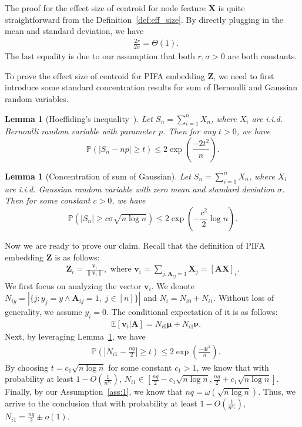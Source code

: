 \documentclass{article} %
\newtheorem{lemma}[theorem]{Lemma}
\begin{document}
The proof for the effect size of centroid for node feature $\mathbf{X}$ is quite straightforward from the Definition~\ref{def:eff_size}. By directly plugging in the mean and standard deviation, we have
\begin{align}
	& \frac{2r}{2\sigma} = \Theta(1).
\end{align}
The last equality is due to our assumption that both $r,\sigma>0$ are both constants.

To prove the effect size of centroid for PIFA embedding $\mathbf{Z}$, we need to first introduce some standard concentration results for sum of Bernoulli and Gaussian random variables.

\begin{lemma}	[Hoeffiding's inequality~\citep{hoeffding1994probability}]\label{lma:Hoeffding}
	Let $S_n=\sum_{i=1}^{n}X_n$, where $X_i$ are i.i.d. Bernoulli random variable with parameter $p$. Then for any $t>0$, we have
	\begin{equation}
		\mathbb{P}\left(|S_n - np|\geq t\right) \leq 2 \exp(\frac{-2t^2}{n}).
	\end{equation}
\end{lemma}

\begin{lemma}	[Concentration of sum of Gaussian]\label{lma:gauss_concentration}
	Let $S_n=\sum_{i=1}^{n}X_n$, where $X_i$ are i.i.d. Gaussian random variable with zero mean and standard deviation $\sigma$. Then for some constant $c>0$, we have
	\begin{equation}
		\mathbb{P}\left(|S_n|\geq c\sigma \sqrt{n\log n }\right) \leq 2 \exp(-\frac{c^2}{2}\log n).
	\end{equation}
\end{lemma}

Now we are ready to prove our claim. Recall that the definition of PIFA embedding $\mathbf{Z}$ is as follows:
\begin{align}
	\mathbf{Z}_i=\frac{\mathbf{v}_i}{\|\mathbf{v}_i\|},\text{ where }\mathbf{v}_i=\sum_{j:\mathbf{A}_{ij}=1}\mathbf{X}_j=\left[\mathbf{A}\mathbf{X}\right]_i.
\end{align}
We first focus on analyzing the vector $\mathbf{v}_i$. We denote $N_{iy}=|\{j:y_j=y \wedge \mathbf{A}_{ij}=1,\;j\in[n]\}|$ and $N_i=N_{i0}+N_{i1}$. Without loss of generality, we assume $y_i=0$. The conditional expectation of it is as follows:
\begin{align}
	& \mathbb{E}\left[\mathbf{v}_i |\mathbf{A}\right]= N_{i0}\boldsymbol{\mu} + N_{i1}\boldsymbol{\nu}.
\end{align}
Next, by leveraging Lemma~\ref{lma:Hoeffding}, we have
\begin{align}
	& \mathbb{P}(|N_{i1}-\frac{nq}{2}|\geq t) \leq 2\exp(\frac{-4t^2}{n}).
\end{align}
By choosing $t = c_1\sqrt{n\log n}$ for some constant $c_1>1$, we know that with probability at least $1-O(\frac{1}{n^{c_1}})$, $N_{i1}\in [\frac{nq}{2}-c_1\sqrt{n\log n},\frac{nq}{2}+c_1\sqrt{n\log n}]$. Finally, by our Assumption~\ref{ass:1}, we know that $nq = \omega(\sqrt{n\log n})$. Thus, we arrive to the conclusion that with probability at least $1-O(\frac{1}{n^{c_1}})$, $N_{i1}=\frac{nq}{2}\pm o(1)$.
\end{document}
